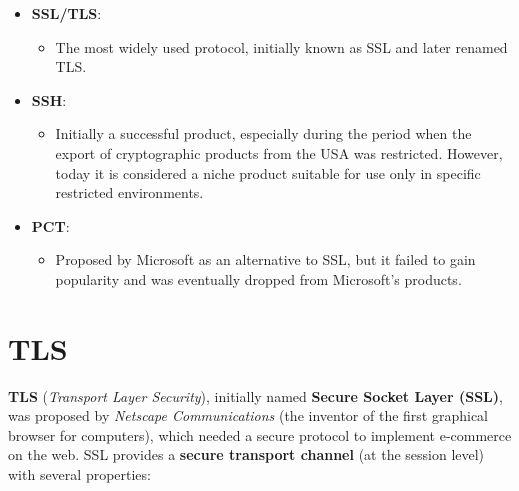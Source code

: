 \begin{itemize}
    \item \textbf{SSL/TLS}:
          \begin{itemize}
              \item The most widely used protocol, initially known as SSL and later renamed TLS.
          \end{itemize}
    \item \textbf{SSH}:
          \begin{itemize}
              \item Initially a successful product, especially during the period when the export of cryptographic products from the USA was restricted. However, today it is considered a niche product suitable for use only in specific restricted environments.
          \end{itemize}
    \item \textbf{PCT}:
          \begin{itemize}
              \item Proposed by Microsoft as an alternative to SSL, but it failed to gain popularity and was eventually dropped from Microsoft's products.
          \end{itemize}
\end{itemize}


\section{TLS}
\textbf{TLS} (\textit{Transport Layer Security}), initially named \textbf{Secure Socket Layer (SSL)}, was proposed by \textit{Netscape Communications} (the inventor of the first graphical browser for computers), which needed a secure protocol to implement e-commerce on the web. SSL provides a \textbf{secure transport channel} (at the session level) with several properties:

